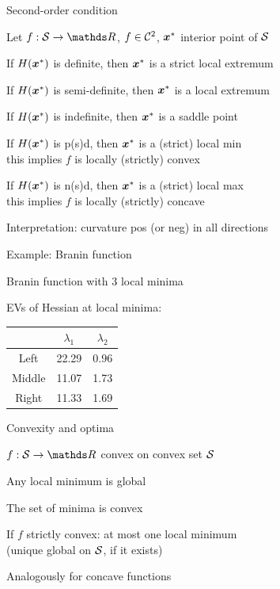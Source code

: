 \documentclass[11pt,compress,t,notes=noshow, xcolor=table]{beamer}
\begin{document}
\begin{framei}[fs=footnotesize]{Second-order condition}
\item Let $f: \S \to \R$, $f \in \CC{2}$, $\xvs$ interior point of $\S$
\item If $H(\xvs)$ is definite, then $\xvs$ is a strict local extremum
\item If $H(\xvs)$ is semi-definite, then $\xvs$ is a local extremum
\item If $H(\xvs)$ is indefinite, then $\xvs$ is a saddle point
\item If $H(\xvs)$ is p(s)d, then $\xvs$ is a (strict) local min\\
this implies $f$ is locally (strictly) convex
\item If $H(\xvs)$ is n(s)d, then $\xvs$ is a (strict) local max\\
this implies $f$ is locally (strictly) concave
\item Interpretation: curvature pos (or neg) in all directions
\end{framei}


\begin{framei}{Example: Branin function}
\item Branin function with 3 local minima
\item EVs of Hessian at local minima:
\begin{center}
\begin{tabular}{c|c|c}
        & $\lambda_1$ & $\lambda_2$ \\ \hline\hline
Left    & 22.29       & 0.96        \\ \hline
Middle  & 11.07       & 1.73        \\ \hline
Right   & 11.33       & 1.69        \\
\end{tabular}
\end{center}
\end{framei}

\begin{framei}{Convexity and optima}
\item $f: \S \to \R$ convex on convex set $\S$
\item Any local minimum is global
\item The set of minima is convex
\item If $f$ strictly convex: at most one local minimum\\
(unique global on $\S$, if it exists)
\item Analogously for concave functions
\end{framei}
\end{document}
